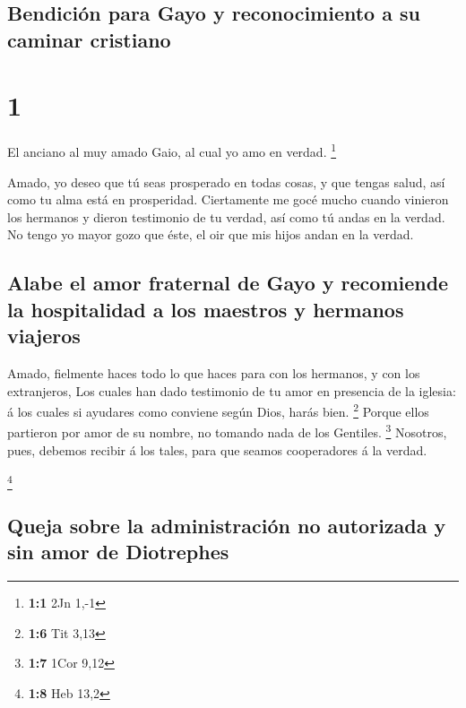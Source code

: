 \hypertarget{bendiciuxf3n-para-gayo-y-reconocimiento-a-su-caminar-cristiano}{%
\subsection{Bendición para Gayo y reconocimiento a su caminar
cristiano}\label{bendiciuxf3n-para-gayo-y-reconocimiento-a-su-caminar-cristiano}}

\hypertarget{section}{%
\section{1}\label{section}}

 El anciano al muy amado Gaio, al cual yo amo en verdad.
\footnote{\textbf{1:1} 2Jn 1,-1}

 Amado, yo deseo que tú seas prosperado en todas cosas, y
que tengas salud, así como tu alma está en prosperidad. 
Ciertamente me gocé mucho cuando vinieron los hermanos y dieron
testimonio de tu verdad, así como tú andas en la verdad. 
No tengo yo mayor gozo que éste, el oir que mis hijos andan en la
verdad.

\hypertarget{alabe-el-amor-fraternal-de-gayo-y-recomiende-la-hospitalidad-a-los-maestros-y-hermanos-viajeros}{%
\subsection{Alabe el amor fraternal de Gayo y recomiende la hospitalidad
a los maestros y hermanos
viajeros}\label{alabe-el-amor-fraternal-de-gayo-y-recomiende-la-hospitalidad-a-los-maestros-y-hermanos-viajeros}}

 Amado, fielmente haces todo lo que haces para con los
hermanos, y con los extranjeros,  Los cuales han dado
testimonio de tu amor en presencia de la iglesia: á los cuales si
ayudares como conviene según Dios, harás bien. \footnote{\textbf{1:6}
  Tit 3,13}  Porque ellos partieron por amor de su nombre,
no tomando nada de los Gentiles. \footnote{\textbf{1:7} 1Cor 9,12}
 Nosotros, pues, debemos recibir á los tales, para que
seamos cooperadores á la verdad.

\footnote{\textbf{1:8} Heb 13,2}

\hypertarget{queja-sobre-la-administraciuxf3n-no-autorizada-y-sin-amor-de-diotrephes}{%
\subsection{Queja sobre la administración no autorizada y sin amor de
Diotrephes}\label{queja-sobre-la-administraciuxf3n-no-autorizada-y-sin-amor-de-diotrephes}}

